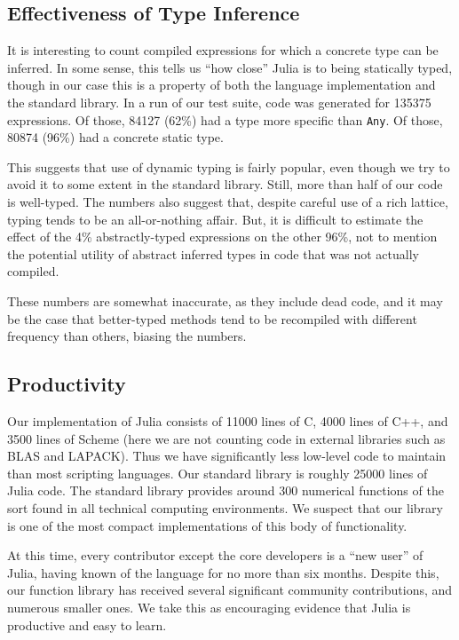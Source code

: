 \documentclass[9pt]{sigplanconf}
\begin{document}
\subsection{Effectiveness of Type Inference}

It is interesting to count compiled expressions for which
a concrete type can be inferred. In some sense, this tells us ``how close''
Julia is to being statically typed, though in our case this is a property
of both the language implementation and the standard library.
In a run of our test suite, code was generated for 135375 expressions.
Of those, 84127 (62\%) had a type more specific than {\tt Any}. Of those,
80874 (96\%) had a concrete static type.

This suggests that use of dynamic typing is fairly popular, even though
we try to avoid it to some extent in the standard library. Still, more
than half of our code is well-typed. The numbers also suggest that,
despite careful use of a rich lattice, typing tends to be an all-or-nothing
affair. But, it is difficult to estimate the effect of the 4\%
abstractly-typed expressions on the other 96\%, not to mention the potential
utility of abstract inferred types in code that was not actually
compiled.

These numbers are somewhat inaccurate, as they include dead code, and
it may be the case that better-typed methods tend to be recompiled with
different frequency than others, biasing the numbers.


\subsection{Productivity}

Our implementation of Julia consists of 11000 lines of C, 4000 lines
of C++, and 3500 lines of Scheme (here we are not counting code in
external libraries such as BLAS and LAPACK).  Thus we have
significantly less low-level code to maintain than most scripting
languages.  Our standard library is roughly 25000 lines of Julia code.
The standard library provides around 300 numerical functions of the
sort found in all technical computing environments. We suspect that
our library is one of the most compact implementations of this body of
functionality.

At this time, every contributor except the core developers is a ``new
user'' of Julia, having known of the language for no more than six
months.  Despite this, our function library has received several
significant community contributions, and numerous smaller ones. We
take this as encouraging evidence that Julia is productive and easy to
learn.
\end{document}
